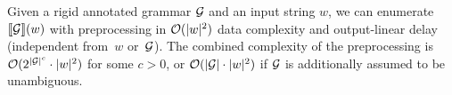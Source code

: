 \begin{theorem}
\label{gram:thm:quadratic}
  Given a rigid annotated grammar $\mathcal{G}$ and an input string $w$, we can enumerate
  ${\llbracket{\mathcal{G}}\rrbracket}(w)$ with preprocessing in $\mathcal{O}(|w|^2)$ data complexity and
  output-linear delay (independent from~$w$ or~$\mathcal{G}$). The combined complexity
  of the preprocessing is $\mathcal{O}(2^{|\mathcal{G}|^c} \cdot |w|^2)$ for some $c >0$, or
  $\mathcal{O}(|\mathcal{G}| \cdot
  |w|^2)$ if $\mathcal{G}$ is additionally assumed to be unambiguous.
\end{theorem}

